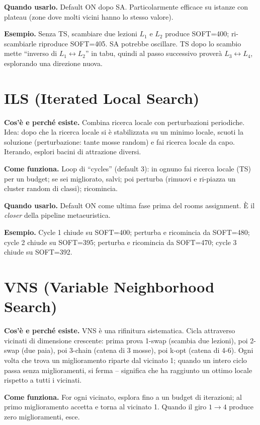 \textbf{Quando usarlo.} Default ON dopo SA. Particolarmente
efficace su istanze con plateau (zone dove molti vicini hanno
lo stesso valore).

\textbf{Esempio.} Senza TS, scambiare due lezioni $L_1$ e
$L_2$ produce SOFT=400; ri-scambiarle riproduce SOFT=405.
SA potrebbe oscillare. TS dopo lo scambio mette ``inverso di
$L_1 \leftrightarrow L_2$'' in tabu, quindi al passo
successivo prover\`a $L_3 \leftrightarrow L_4$, esplorando
una direzione nuova.

\section{ILS (Iterated Local Search)}

\textbf{Cos'\`e e perch\'e esiste.} Combina ricerca locale
con perturbazioni periodiche. Idea: dopo che la ricerca
locale si \`e stabilizzata su un minimo locale, scuoti la
soluzione (perturbazione: tante mosse random) e fai ricerca
locale da capo. Iterando, esplori bacini di attrazione
diversi.

\textbf{Come funziona.} Loop di ``cycles'' (default 3): in
ognuno fai ricerca locale (TS) per un budget; se sei migliorato,
salvi; poi perturba (rimuovi e ri-piazza un cluster random
di classi); ricomincia.

\textbf{Quando usarlo.} Default ON come ultima fase prima
del rooms assignment. \`E il \emph{closer} della pipeline
metaeuristica.

\textbf{Esempio.} Cycle 1 chiude su SOFT=400; perturba e
ricomincia da SOFT=480; cycle 2 chiude su SOFT=395; perturba
e ricomincia da SOFT=470; cycle 3 chiude su SOFT=392.

\section{VNS (Variable Neighborhood Search)}

\textbf{Cos'\`e e perch\'e esiste.} VNS \`e una rifinitura
sistematica. Cicla attraverso vicinati di dimensione
crescente: prima prova 1-swap (scambia due lezioni), poi
2-swap (due paia), poi 3-chain (catena di 3 mosse), poi k-opt
(catena di 4-6). Ogni volta che trova un miglioramento riparte
dal vicinato 1; quando un intero ciclo passa senza
miglioramenti, si ferma -- significa che ha raggiunto un
ottimo locale rispetto a tutti i vicinati.

\textbf{Come funziona.} For ogni vicinato, esplora fino a un
budget di iterazioni; al primo miglioramento accetta e torna
al vicinato 1. Quando il giro $1 \to 4$ produce zero
miglioramenti, esce.

